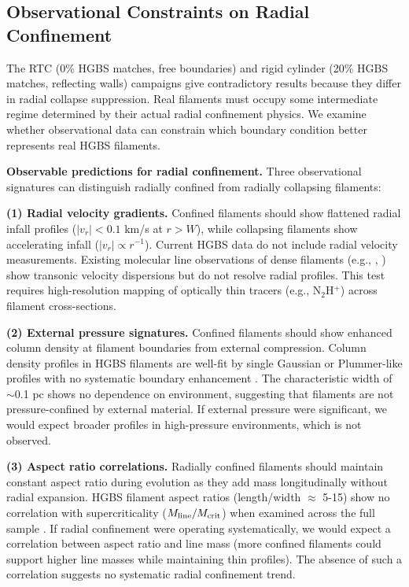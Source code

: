 \documentclass[twocolumn]{mnras}
\begin{document}
\subsection{Observational Constraints on Radial Confinement}
\label{sec:radial_confinement}

The RTC (0\% HGBS matches, free boundaries) and rigid cylinder (20\% HGBS matches, reflecting walls) campaigns give contradictory results because they differ in radial collapse suppression. Real filaments must occupy some intermediate regime determined by their actual radial confinement physics. We examine whether observational data can constrain which boundary condition better represents real HGBS filaments.

\textbf{Observable predictions for radial confinement.}
Three observational signatures can distinguish radially confined from radially collapsing filaments:

\textbf{(1) Radial velocity gradients.}
Confined filaments should show flattened radial infall profiles ($|v_r| < 0.1$ km/s at $r > W$), while collapsing filaments show accelerating infall ($|v_r| \propto r^{-1}$). Current HGBS data do not include radial velocity measurements. Existing molecular line observations of dense filaments (e.g., \citet{Hacar2013}, \citet{Arzoumanian2013}) show transonic velocity dispersions but do not resolve radial profiles. This test requires high-resolution mapping of optically thin tracers (e.g., N$_2$H$^+$) across filament cross-sections.

\textbf{(2) External pressure signatures.}
Confined filaments should show enhanced column density at filament boundaries from external compression. Column density profiles in HGBS filaments are well-fit by single Gaussian or Plummer-like profiles with no systematic boundary enhancement \citep{Arzoumanian2011}. The characteristic width of $\sim$0.1 pc shows no dependence on environment, suggesting that filaments are not pressure-confined by external material. If external pressure were significant, we would expect broader profiles in high-pressure environments, which is not observed.

\textbf{(3) Aspect ratio correlations.}
Radially confined filaments should maintain constant aspect ratio during evolution as they add mass longitudinally without radial expansion. HGBS filament aspect ratios (length/width $\approx$ 5-15) show no correlation with supercriticality ($M_{\rm line}/M_{\rm crit}$) when examined across the full sample \citep{Arzoumanian2019}. If radial confinement were operating systematically, we would expect a correlation between aspect ratio and line mass (more confined filaments could support higher line masses while maintaining thin profiles). The absence of such a correlation suggests no systematic radial confinement trend.
\end{document}
